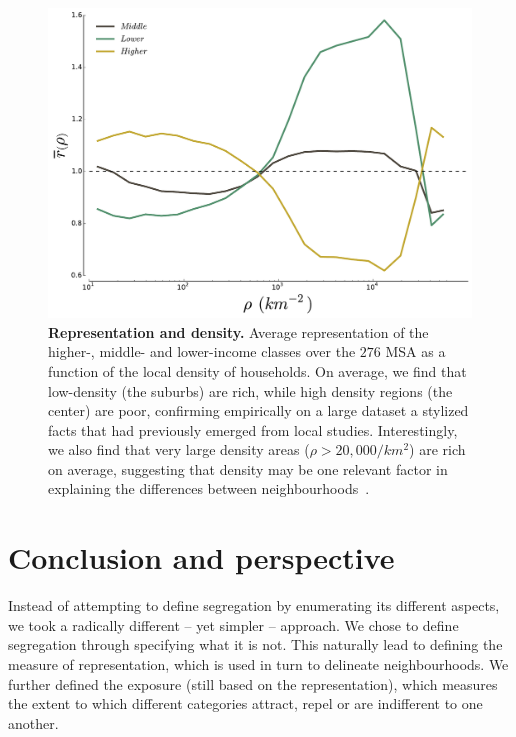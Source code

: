 \begin{figure}
    \centering
    \includegraphics[width=\textwidth]{gfx/chapter-segregation/figure4.pdf}
    \caption{{\bf Representation and density.} Average representation of the higher-, middle- and
      lower-income classes over the $276$ MSA as a function of the
      local density of households. On average, we find that low-density (the
      suburbs) are rich, while high density regions (the center) are poor,
      confirming empirically on a large dataset a stylized facts that had previously
      emerged from local studies. Interestingly, we also
      find that  very large density areas ($\rho>20,000/km^2$) are rich on average,
      suggesting that density may be one relevant factor in explaining the
      differences between neighbourhoods~\cite{Jacobs:1961}.
      \label{fig:high_low_densities}
  } 
  \end{figure}

\section{Conclusion and perspective}
\label{sec:conclusion_and_perspective}

Instead of attempting to define segregation by enumerating its different
aspects, we took a radically different -- yet simpler -- approach. We chose to
define segregation through specifying what it is not.  This naturally lead to
defining the measure of representation, which is used in turn to delineate
neighbourhoods. We further defined the exposure (still based on the
representation), which measures the extent to which different categories
attract, repel or are indifferent to one another.

